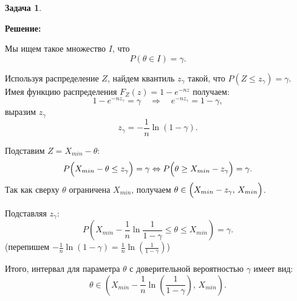 \documentclass[a4paper,11pt]{article}
\newenvironment{shdd}{\begin{mdframed}[backgroundcolor=shadecolor]}{\end{mdframed}}
\theoremstyle{definition}
\newtheorem{problem}{Задача}\setlength{\parindent}{0pt}
\newenvironment{solution}
{\begin{shdd}\textbf{Решение:}\par\setlength{\parindent}{0pt}}
{\end{shdd}}
\newenvironment{answer}
{\par\noindent\textbf{Ответ:}}
{\par}
\begin{document}
\begin{problem}
\begin{solution}

        Мы ищем такое множество \(I\), что
        \[
        P(\theta \in I) = \gamma.
        \]
        
        Используя распределение \(Z\), найдем квантиль \(z_\gamma\) такой, что \(P(Z \le z_\gamma) = \gamma\).
        \\Имея функцию распределения \(F_Z(z)=1-e^{-nz}\) получаем:
        \[
        1-e^{-nz_\gamma}=\gamma \quad \Rightarrow \quad e^{-nz_\gamma}=1-\gamma,
        \]
        выразим \(z_{\gamma}\)
        \[
        z_\gamma=-\frac{1}{n}\ln(1-\gamma).
        \]
    
        Подставим \(Z=X_{min}-\theta\):
        \[
        P\Bigl(X_{min} -\theta \le z_\gamma \Bigr)=\gamma \Leftrightarrow P\Bigl(\theta \ge X_{min} - z_\gamma \Bigr)=\gamma.
        \]
        Так как сверху \(\theta\) ограничена \(X_{min}\), получаем
        \(\theta \in \Bigl(X_{min} - z_\gamma,\, X_{min}\Bigr)\).

        Подставляя \(z_{\gamma}\):
        \[
        P\left(X_{min} - \frac{1}{n}\ln\frac{1}{1-\gamma} \le \theta \le X_{min}\right)=\gamma.
        \]
        (перепишем \(-\frac{1}{n}\ln(1-\gamma)=\frac{1}{n}\ln\left(\frac{1}{1-\gamma}\right)\))

        \vspace{10pt}
        Итого, интервал для параметра \(\theta\) с доверительной вероятностью \(\gamma\) имеет вид:
        \[
        \theta \in \left(X_{min} - \frac{1}{n}\ln\left(\frac{1}{1-\gamma}\right),\, X_{min}\right).
        \]
    \end{solution}
    


\end{problem}

\vspace{25pt}
\end{document}
